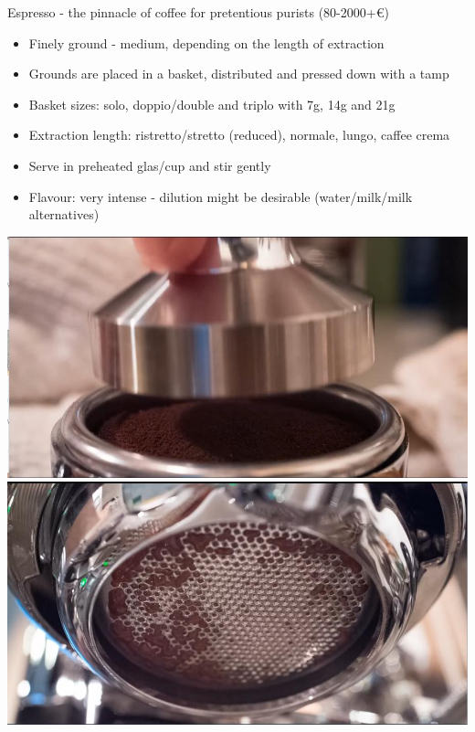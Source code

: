 \documentclass[10pt,graphics,aspectratio=169,table]{beamer}
\begin{document}
\begin{frame}{Espresso - the pinnacle of coffee for pretentious purists (80-2000+€)}
\begin{itemize}
    \item Finely ground - medium, depending on the length of extraction
    \item Grounds are placed in a basket, distributed and pressed down with a tamp
    \item Basket sizes: solo, doppio/double and triplo with 7g, 14g and 21g
    \item Extraction length: ristretto/stretto (reduced), normale, lungo, caffee crema
    \item Serve in preheated glas/cup and stir gently
    \item Flavour: very intense - dilution might be desirable (water/milk/milk alternatives)
\end{itemize}
    \includegraphics[scale=0.2]{img/Screenshot_2022-10-02_08-08-13.jpg} \cite{espresso}
    \includegraphics[scale=0.2]{img/Screenshot_2022-10-02_08-09-04.jpg} \cite{espresso}

\end{frame}
\end{document}
